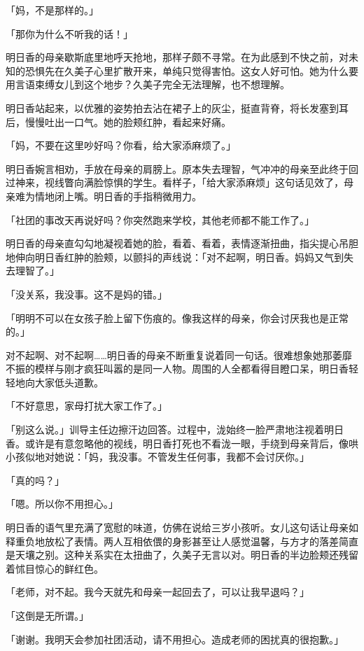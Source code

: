 \documentclass[UTF8]{ctexart}
\begin{document}
    「妈，不是那样的。」 

    「那你为什么不听我的话！」 

    明日香的母亲歇斯底里地呼天抢地，那样子颇不寻常。在为此感到不快之前，对未知的恐惧先在久美子心里扩散开来，单纯只觉得害怕。这女人好可怕。她为什么要用言语束缚女儿到这个地步？久美子完全无法理解，也不想理解。 

    明日香站起来，以优雅的姿势拍去沾在裙子上的灰尘，挺直背脊，将长发塞到耳后，慢慢吐出一口气。她的脸颊红肿，看起来好痛。 

    「妈，不要在这里吵好吗？你看，给大家添麻烦了。」 

    明日香婉言相劝，手放在母亲的肩膀上。原本失去理智，气冲冲的母亲至此终于回过神来，视线瞥向满脸惊惧的学生。看样子，「给大家添麻烦」这句话见效了，母亲难为情地闭上嘴。明日香的手指稍微用力。 

    「社团的事改天再说好吗？你突然跑来学校，其他老师都不能工作了。」 

    明日香的母亲直勾勾地凝视着她的脸，看着、看着，表情逐渐扭曲，指尖提心吊胆地伸向明日香红肿的脸颊，以颤抖的声线说：「对不起啊，明日香。妈妈又气到失去理智了。」 

    「没关系，我没事。这不是妈的错。」 

    「明明不可以在女孩子脸上留下伤痕的。像我这样的母亲，你会讨厌我也是正常的。」 

    对不起啊、对不起啊……明日香的母亲不断重复说着同一句话。很难想象她那萎靡不振的模样与刚才疯狂叫嚣的是同一人物。周围的人全都看得目瞪口呆，明日香轻轻地向大家低头道歉。 

    「不好意思，家母打扰大家工作了。」 

    「别这么说。」训导主任边擦汗边回答。过程中，泷始终一脸严肃地注视着明日香。或许是有意忽略他的视线，明日香打死也不看泷一眼，手绕到母亲背后，像哄小孩似地对她说：「妈，我没事。不管发生任何事，我都不会讨厌你。」 

    「真的吗？」 

    「嗯。所以你不用担心。」 

    明日香的语气里充满了宽慰的味道，仿佛在说给三岁小孩听。女儿这句话让母亲如释重负地放松了表情。两人互相依偎的身影甚至让人感觉温馨，与方才的落差简直是天壤之别。这种关系实在太扭曲了，久美子无言以对。明日香的半边脸颊还残留着怵目惊心的鲜红色。 

    「老师，对不起。我今天就先和母亲一起回去了，可以让我早退吗？」 

    「这倒是无所谓。」 

    「谢谢。我明天会参加社团活动，请不用担心。造成老师的困扰真的很抱歉。」 
\end{document}
